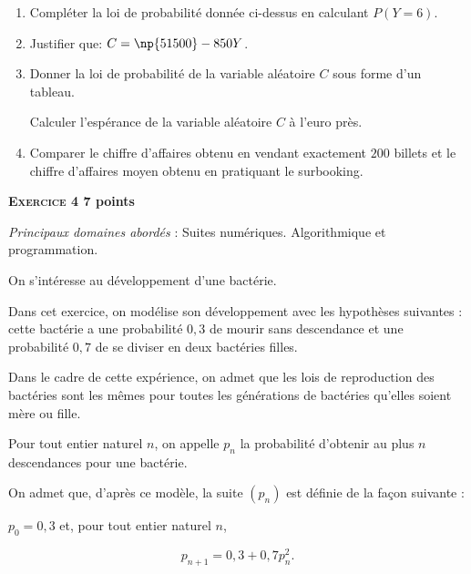 \documentclass[10pt,a4paper]{article}
\begin{document}
\begin{enumerate}
	\begin{enumerate}
		\item Compléter la loi de probabilité donnée ci-dessus en calculant $P(Y = 6)$.
		\item Justifier que: $C = \np{51500} - 850Y$.
		\item Donner la loi de probabilité de la variable aléatoire $C$ sous forme d'un tableau.
		
Calculer l'espérance de la variable aléatoire $C$ à l'euro près.
		\item Comparer le chiffre d'affaires obtenu en vendant exactement $200$ billets et le chiffre d'affaires moyen obtenu en pratiquant le surbooking.
	\end{enumerate}
\end{enumerate}

\bigskip

\textbf{\textsc{Exercice 4} \hfill 7 points}

\medskip

\emph{Principaux domaines abordés} : Suites numériques.
Algorithmique et programmation.

\bigskip

On s'intéresse au développement d'une bactérie.

Dans cet exercice, on modélise son développement avec les hypothèses suivantes : cette bactérie a une probabilité $0,3$ de mourir sans descendance et une probabilité $0,7$ de se diviser en deux bactéries filles.

Dans le cadre de cette expérience, on admet que les lois de reproduction des bactéries sont les mêmes pour toutes les générations de bactéries qu'elles soient mère ou fille.

Pour tout entier naturel $n$, on appelle $p_n$ la probabilité d'obtenir au plus $n$ descendances pour une bactérie.

On admet que, d'après ce modèle, la suite $\left(p_n\right)$ est définie de la façon suivante :

$p_0 = 0,3$ et, pour tout entier naturel $n$,

\[p_{n+1} = 0,3 + 0,7p_n^2.\]
\end{document}
